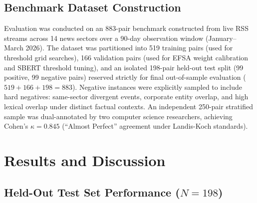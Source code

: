 \documentclass[conference]{IEEEtran}
\begin{document}
\subsection{Benchmark Dataset Construction}
Evaluation was conducted on an 883-pair benchmark constructed from live RSS streams across 14 news sectors over a 90-day observation window (January--March 2026).
The dataset was partitioned into 519 training pairs (used for threshold grid searches), 166 validation pairs (used for EFSA weight calibration and SBERT threshold tuning), and an isolated 198-pair held-out test split (99 positive, 99 negative pairs) reserved strictly for final out-of-sample evaluation ($519 + 166 + 198 = 883$).
Negative instances were explicitly sampled to include hard negatives: same-sector divergent events, corporate entity overlap, and high lexical overlap under distinct factual contexts.
An independent 250-pair stratified sample was dual-annotated by two computer science researchers, achieving Cohen's $\kappa = 0.845$ (``Almost Perfect'' agreement under Landis-Koch standards).

\section{Results and Discussion}

\subsection{Held-Out Test Set Performance ($N = 198$)}
\end{document}
